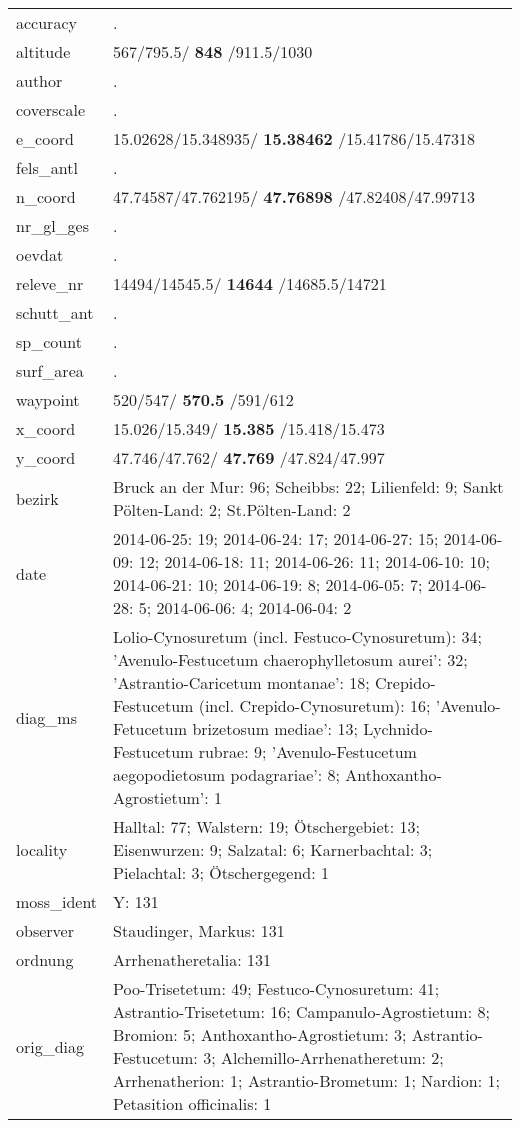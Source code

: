 \documentclass[9pt]{article}
\begin{document}
\begin{longtable}{lllllllllllllll}
\midrule
accuracy& \multicolumn{14}{p{150mm}}{.}\tabularnewline
altitude& \multicolumn{14}{p{150mm}}{567/795.5/\textbf{ 848 }/911.5/1030}\tabularnewline
author& \multicolumn{14}{p{150mm}}{.}\tabularnewline
coverscale& \multicolumn{14}{p{150mm}}{.}\tabularnewline
e_coord& \multicolumn{14}{p{150mm}}{15.02628/15.348935/\textbf{ 15.38462 }/15.41786/15.47318}\tabularnewline
fels_antl& \multicolumn{14}{p{150mm}}{.}\tabularnewline
n_coord& \multicolumn{14}{p{150mm}}{47.74587/47.762195/\textbf{ 47.76898 }/47.82408/47.99713}\tabularnewline
nr_gl_ges& \multicolumn{14}{p{150mm}}{.}\tabularnewline
oevdat& \multicolumn{14}{p{150mm}}{.}\tabularnewline
releve_nr& \multicolumn{14}{p{150mm}}{14494/14545.5/\textbf{ 14644 }/14685.5/14721}\tabularnewline
schutt_ant& \multicolumn{14}{p{150mm}}{.}\tabularnewline
sp_count& \multicolumn{14}{p{150mm}}{.}\tabularnewline
surf_area& \multicolumn{14}{p{150mm}}{.}\tabularnewline
waypoint& \multicolumn{14}{p{150mm}}{520/547/\textbf{ 570.5 }/591/612}\tabularnewline
x_coord& \multicolumn{14}{p{150mm}}{15.026/15.349/\textbf{ 15.385 }/15.418/15.473}\tabularnewline
y_coord& \multicolumn{14}{p{150mm}}{47.746/47.762/\textbf{ 47.769 }/47.824/47.997}\tabularnewline
bezirk& \multicolumn{14}{p{150mm}}{Bruck an der Mur: 96; Scheibbs: 22; Lilienfeld: 9; Sankt Pölten-Land: 2; St.Pölten-Land: 2}\tabularnewline
date& \multicolumn{14}{p{150mm}}{2014-06-25: 19; 2014-06-24: 17; 2014-06-27: 15; 2014-06-09: 12; 2014-06-18: 11; 2014-06-26: 11; 2014-06-10: 10; 2014-06-21: 10; 2014-06-19: 8; 2014-06-05: 7; 2014-06-28: 5; 2014-06-06: 4; 2014-06-04: 2}\tabularnewline
diag_ms& \multicolumn{14}{p{150mm}}{Lolio-Cynosuretum (incl. Festuco-Cynosuretum): 34; 'Avenulo-Festucetum chaerophylletosum aurei': 32; 'Astrantio-Caricetum montanae': 18; Crepido-Festucetum (incl. Crepido-Cynosuretum): 16; 'Avenulo-Fetucetum brizetosum mediae': 13; Lychnido-Festucetum rubrae: 9; 'Avenulo-Festucetum aegopodietosum podagrariae': 8; Anthoxantho-Agrostietum': 1}\tabularnewline
locality& \multicolumn{14}{p{150mm}}{Halltal: 77; Walstern: 19; Ötschergebiet: 13; Eisenwurzen: 9; Salzatal: 6; Karnerbachtal: 3; Pielachtal: 3; Ötschergegend: 1}\tabularnewline
moss_ident& \multicolumn{14}{p{150mm}}{Y: 131}\tabularnewline
observer& \multicolumn{14}{p{150mm}}{Staudinger, Markus: 131}\tabularnewline
ordnung& \multicolumn{14}{p{150mm}}{Arrhenatheretalia: 131}\tabularnewline
orig_diag& \multicolumn{14}{p{150mm}}{Poo-Trisetetum: 49; Festuco-Cynosuretum: 41; Astrantio-Trisetetum: 16; Campanulo-Agrostietum: 8; Bromion: 5; Anthoxantho-Agrostietum: 3; Astrantio-Festucetum: 3; Alchemillo-Arrhenatheretum: 2; Arrhenatherion: 1; Astrantio-Brometum: 1; Nardion: 1; Petasition officinalis: 1}\tabularnewline

\end{longtable}
\end{document}
